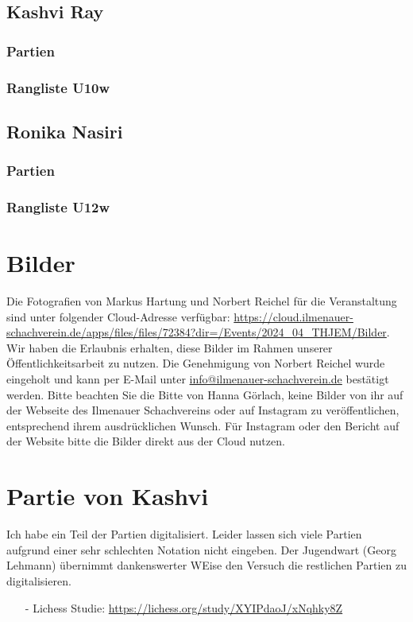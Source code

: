 \documentclass[a4paper,ngerman]{tui-algo-seminar}
\begin{document}
\subsection{Kashvi Ray}
    \subsubsection{Partien}
        
    \subsubsection{Rangliste U10w}
        
\clearpage

\subsection{Ronika Nasiri}
    \subsubsection{Partien}
        
    \subsubsection{Rangliste U12w}
        
    
\clearpage


\section{Bilder}
Die Fotografien von Markus Hartung und Norbert Reichel für die Veranstaltung sind unter folgender Cloud-Adresse verfügbar: \url{https://cloud.ilmenauer-schachverein.de/apps/files/files/72384?dir=/Events/2024_04_THJEM/Bilder}. Wir haben die Erlaubnis erhalten, diese Bilder im Rahmen unserer Öffentlichkeitsarbeit zu nutzen. Die Genehmigung von Norbert Reichel wurde eingeholt und kann per E-Mail unter \href{mailto:info@ilmenauer-schachverein.de}{info@ilmenauer-schachverein.de} bestätigt werden.
Bitte beachten Sie die Bitte von Hanna Görlach, keine Bilder von ihr auf der Webseite des Ilmenauer Schachvereins oder auf Instagram zu veröffentlichen, entsprechend ihrem ausdrücklichen Wunsch. Für Instagram oder den Bericht auf der Website bitte die Bilder direkt aus der Cloud nutzen.




\clearpage
\section{Partie von Kashvi}
Ich habe ein Teil der Partien digitalisiert. Leider lassen sich viele Partien aufgrund einer sehr schlechten Notation nicht eingeben. Der Jugendwart (Georg Lehmann) übernimmt dankenswerter WEise den Versuch die restlichen Partien zu digitalisieren.
\begin{itemize}
    \item[-] Lichess Studie: \url{https://lichess.org/study/XYIPdaoJ/xNqhky8Z}
\end{itemize}
\end{document}
